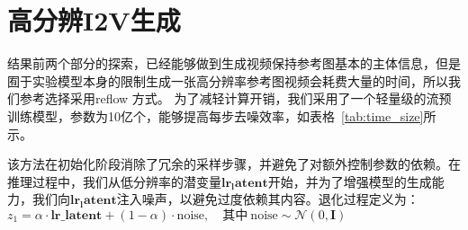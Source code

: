 \section{高分辨I2V生成}
\begin{table}[htbp]
    \centering
    \caption{Comparison of model parameters and inference time at different resolution and frames. OOM denotes "out of memory".}
    \label{tab:time_size}
\end{table}


结果前两个部分的探索，已经能够做到生成视频保持参考图基本的主体信息，但是囿于实验模型本身的限制生成一张高分辨率参考图视频会耗费大量的时间，所以我们参考\cite{zhang2025flashvideo
}选择采用reflow 方式。
为了减轻计算开销，我们采用了一个轻量级的流预训练模型，参数为10亿个，能够提高每步去噪效率，如表格~\cref{tab:time_size}所示。
    
该方法在初始化阶段消除了冗余的采样步骤，并避免了对额外控制参数的依赖。在推理过程中，我们从低分辨率的潜变量$\mathbf{lr_latent}$开始，并为了增强模型的生成能力，我们向$\mathbf{lr_latent}$注入噪声，以避免过度依赖其内容。退化过程定义为：
$z_1 = \alpha \cdot \mathbf{lr\_latent} + (1 - \alpha) \cdot \text{noise}, \quad \text{其中} \ \text{noise} \sim \mathcal{N}(0, \mathbf{I})$

